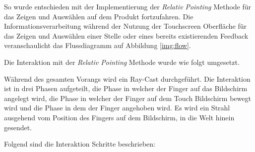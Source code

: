 So wurde entschieden mit der Implementierung der \textit{Relativ Pointing} Methode für das Zeigen und Auswählen auf dem Produkt fortzufahren.  Die Informationsverarbeitung während der Nutzung der Touchscreen Oberfläche für das Zeigen und Auswählen einer 
Stelle oder eines bereits existierenden Feedback veranschaulicht das Flussdiagramm auf Abbildung \ref{img:flow}. 

Die Interaktion mit der \textit{Relativ Pointing} Methode wurde wie folgt umgesetzt. 

Während des gesamten Vorangs wird ein Ray-Cast durchgeführt. Die Interaktion ist in drei Phasen aufgeteilt, die Phase in welcher der Finger auf das Bildschirm angelegt wird, die Phase in welcher der Finger auf dem Touch Bildschirm bewegt wird und die Phase in dem 
der Finger angehoben wird. Es wird ein Strahl ausgehend vom Position des Fingers auf dem Bildschirm, in die Welt hinein gesendet. 

Folgend sind die Interaktion Schritte beschrieben:

